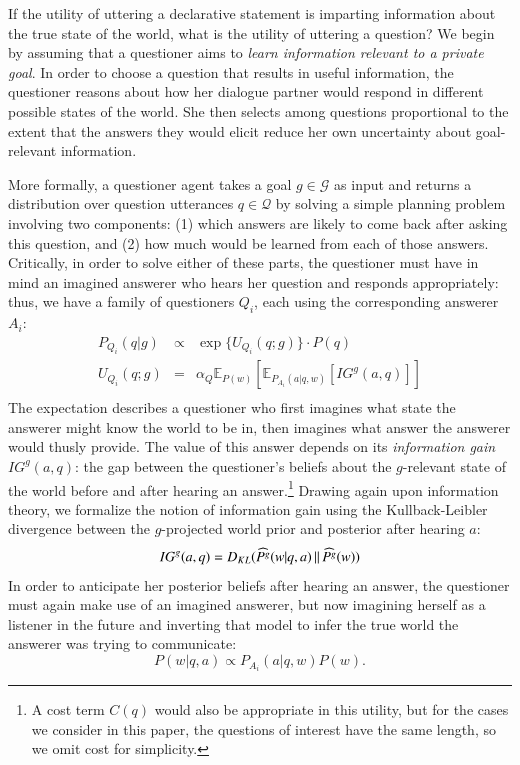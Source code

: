\documentclass[11pt, floatsintext]{apa6}
\newcommand{\KL}[2]{\ensuremath{D_{KL}({#1}\, \| \, {#2})}}
\newcommand{\E}[2]{\ensuremath{\mathbb{E}_{#1}\left [#2 \right]}}
\begin{document}
If the utility of uttering a declarative statement is imparting information about the true state of the world, what is the utility of uttering a question? We begin by assuming that a questioner aims to \emph{learn information relevant to a private goal}.
%
In order to choose a question that results in useful information, the questioner reasons about how her dialogue partner would respond in different possible states of the world. 
She then selects among questions proportional to the extent that the answers they would elicit reduce her own uncertainty about goal-relevant information.
%


More formally, a questioner agent takes a goal $g \in \mathcal{G}$ as input and returns a distribution over question utterances $q \in \mathcal{Q}$ by solving a simple planning problem involving two components: (1) which answers are likely to come back after asking this question, and (2) how much would be learned from each of those answers. Critically, in order to solve either of these parts, the questioner must have in mind an imagined answerer who hears her question and responds appropriately: thus, we have a family of questioners $Q_i$, each using the corresponding answerer $A_i$:
%
$$
\begin{array}{lcl}
P_{Q_i}(q|g)  & \propto & \exp\{U_{Q_i}(q;g)\} \cdot P(q)\\
U_{Q_i}(q;g) & = & \alpha_Q \E{P(w)}{ \E{P_{A_i}(a|q,w)}{IG^g(a,q)}}\\
\end{array}
$$
%
The expectation describes a questioner who first imagines what state the answerer might know the world to be in, then imagines what answer the answerer would thusly provide.
The value of this answer depends on its \emph{information gain} $IG^g(a,q)$: the gap between the questioner's beliefs about the $g$-relevant state of the world before and after hearing an answer.\footnote{A cost term $C(q)$ would also be appropriate in this utility, but for the cases we consider in this paper, the questions of interest have the same length, so we omit cost for simplicity.} Drawing again upon information theory, we formalize the notion of information gain using the Kullback-Leibler divergence between the $g$-projected world prior and posterior after hearing $a$:
%
$$
IG^g(a,q) = \KL{\widehat{P^g}(w|q, a)}{\widehat{P^g}(w)}\\
$$
%
In order to anticipate her posterior beliefs after hearing an answer, the questioner must again make use of an imagined answerer, but now imagining herself as a listener in the future and inverting that model to infer the true world the answerer was trying to communicate:
$$P(w|q,a) \propto P_{A_i}(a| q, w)P(w).$$
\end{document}
